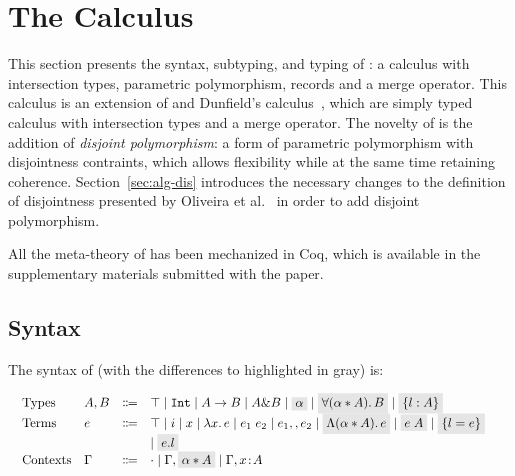 \section{The \name Calculus}\label{sec:fi}
This section presents the syntax, subtyping, and typing of \name: 
a calculus with intersection types, parametric polymorphism, records and a merge operator. 
This calculus is an extension of \oldname and Dunfield's
calculus~\cite{dunfield2014elaborating}, which are simply typed
calculus with intersection types and a merge operator.
The novelty of \name is the addition of \emph{disjoint polymorphism}:
a form of parametric polymorphism with disjointness contraints, which
allows flexibility while at the same time retaining coherence. 
Section~\ref{sec:alg-dis} introduces the necessary changes to the
definition of disjointness presented by Oliveira et al.~\cite{oliveira16disjoint} in
order to add disjoint polymorphism.

All the meta-theory of \name has been mechanized in Coq, which is available in
the supplementary materials submitted with the paper.

\subsection{Syntax}
The syntax of \name (with the differences to \oldname highlighted in gray) is: 

\vspace{-15pt}
  \[
    \begin{array}{l}
      \begin{array}{llrll}
        \text{Types}
        & A, B & \Coloneqq & \top \mid \tyint \mid A \to B \mid A
                             \inter B \mid \highlight{$\alpha$} \mid \highlight{$\fordis \alpha A B$} \mid \highlight{$\recordType l A$} & \\ 

        \text{Terms}
        & e & \Coloneqq & \top \mid i \mid x \mid \lamty x A e \mid \app {e_1} {e_2} 
              \mid e_1 \mergeop e_2 \mid \highlight{$\blamdis \alpha A e$} \mid \highlight{$\tapp e A$} \mid 
              \highlight{$\recordCon l e$} \\ 
        &   &           &\mid \highlight{$\recordProj e l$} & \\
        \text{Contexts}
        & \Gamma & \Coloneqq & \cdot
                   \mid \Gamma, \highlight{$\alpha \disjoint A$}
                   \mid \Gamma, x \oftype A  & \\
      \end{array}
    \end{array}
  \]

